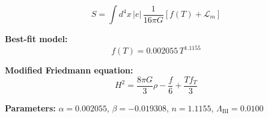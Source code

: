 
\begin{equation}
  S = \int d^4x \, |e| \, \frac{1}{16\pi G} \left[ f(T) + \mathcal{L}_m \right]
\end{equation}

\textbf{Best-fit model:}
\begin{equation}
  f(T) = 0.002055 \, T^{1.1155}
\end{equation}

\textbf{Modified Friedmann equation:}
\begin{equation}
  H^2 = \frac{8\pi G}{3} \rho - \frac{f}{6} + \frac{T f_T}{3}
\end{equation}

\textbf{Parameters:}
$\alpha = 0.002055$, \quad
$\beta = -0.019308$, \quad
$n = 1.1155$, \quad
$\Lambda_{\text{BI}} = 0.0100$
